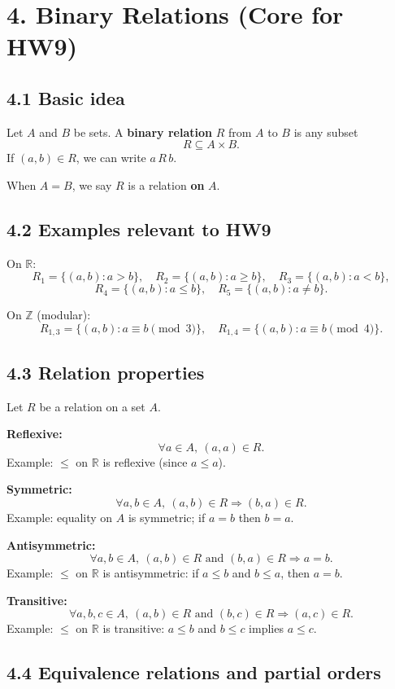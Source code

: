 \documentclass[11pt]{article}
\begin{document}
\section*{4. Binary Relations (Core for HW9)}

\subsection*{4.1 Basic idea}

Let $A$ and $B$ be sets. A \textbf{binary relation} $R$ from $A$ to $B$ is any subset
\[
R \subseteq A\times B.
\]
If $(a,b)\in R$, we can write $a\,R\,b$.

When $A=B$, we say $R$ is a relation \textbf{on} $A$.

\subsection*{4.2 Examples relevant to HW9}

On $\mathbb{R}$:
\[
R_1 = \{(a,b): a>b\},\quad
R_2 = \{(a,b): a\ge b\},\quad
R_3 = \{(a,b): a<b\},
\]
\[
R_4 = \{(a,b): a\le b\},\quad
R_5 = \{(a,b): a\neq b\}.
\]

On $\mathbb{Z}$ (modular):
\[
R_{1,3} = \{(a,b): a\equiv b\pmod{3}\},\quad
R_{1,4} = \{(a,b): a\equiv b\pmod{4}\}.
\]

\subsection*{4.3 Relation properties}

Let $R$ be a relation on a set $A$.

\textbf{Reflexive:}
\[
\forall a\in A,\ (a,a)\in R.
\]
Example: $\le$ on $\mathbb{R}$ is reflexive (since $a\le a$).

\textbf{Symmetric:}
\[
\forall a,b\in A,\ (a,b)\in R \Rightarrow (b,a)\in R.
\]
Example: equality on $A$ is symmetric; if $a=b$ then $b=a$.

\textbf{Antisymmetric:}
\[
\forall a,b\in A,\ (a,b)\in R \text{ and } (b,a)\in R \Rightarrow a=b.
\]
Example: $\le$ on $\mathbb{R}$ is antisymmetric: if $a\le b$ and $b\le a$, then $a=b$.

\textbf{Transitive:}
\[
\forall a,b,c\in A,\ (a,b)\in R \text{ and } (b,c)\in R \Rightarrow (a,c)\in R.
\]
Example: $\le$ on $\mathbb{R}$ is transitive: $a\le b$ and $b\le c$ implies $a\le c$.

\subsection*{4.4 Equivalence relations and partial orders}
\end{document}

